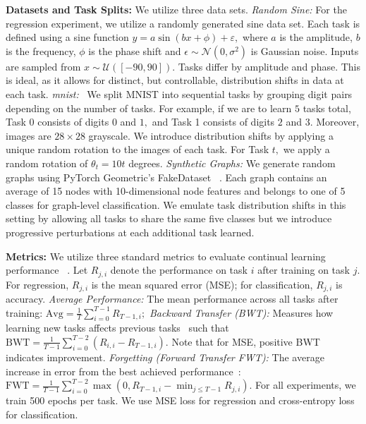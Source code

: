 \textbf{Datasets and Task Splits:} We utilize three data sets.  \textit{Random Sine:} For the regression experiment, we utilize a randomly generated sine data set. Each task is defined using a sine function $y = a\sin(bx + \phi) + \varepsilon,$ where $a$ is the amplitude, $b$ is the frequency, $\phi$ is the phase shift and $\epsilon \sim \mathcal{N}(0, \sigma^2)$ is Gaussian noise. Inputs are sampled from $x \sim \mathcal{U}([-90, 90])$. Tasks differ by amplitude and phase. This is ideal, as it allows for distinct, but controllable, distribution shifts in data at each task. \textit{mnist:}~\cite{lecun1998mnist} We split MNIST into sequential tasks by grouping digit pairs depending on the number of tasks. For example, if we are to learn $5$ tasks total, Task $0$ consists of digits $0$ and $1,$ and Task 1 consists of digits $2$ and $3.$ Moreover, images are $28 \times 28$ grayscale. We introduce distribution shifts by applying a unique random rotation to the images of each task. For Task $t,$ we apply a random rotation of $\theta_t = 10t$ degrees. \textit{Synthetic Graphs:} We generate random graphs using PyTorch Geometric's FakeDataset ~\cite{pyg}. Each graph contains an average of 15 nodes with 10-dimensional node features and belongs to one of 5 classes for graph-level classification. We emulate task distribution shifts in this setting by allowing all tasks to share the same five classes but we introduce progressive perturbations at each additional task learned. 

\textbf{Metrics:} We utilize three standard metrics to evaluate continual learning performance ~\cite{lopez2017gradient, chaudhry2018riemannian, diaz2018dont}. Let $R_{j,i}$ denote the performance on task $i$ after training on task $j$. For regression, $R_{j,i}$ is the mean squared error (MSE); for classification, $R_{j,i}$ is accuracy. \textit{Average Performance:} The mean performance across all tasks after training:
$ \text{Avg} = \frac{1}{T} \sum_{i=0}^{T-1} R_{T-1,i};$ \textit{Backward Transfer (BWT):} Measures how learning new tasks affects previous tasks~\cite{lopez2017gradient} such that $\text{BWT} = \frac{1}{T-1} \sum_{i=0}^{T-2} \left( R_{i,i} - R_{T-1,i} \right).$ Note that for MSE, positive BWT indicates improvement. \textit{Forgetting (Forward Transfer FWT):} The average increase in error from the best achieved performance~\cite{chaudhry2018riemannian}: $  \text{FWT} = \frac{1}{T-1} \sum_{i=0}^{T-2} \max\left(0, R_{T-1,i} - \min_{j \leq T-1} R_{j,i}\right).$ For all experiments, we train 500 epochs per task. We use MSE loss for regression and cross-entropy loss for classification.

